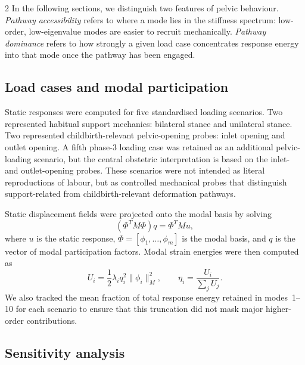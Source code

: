 \documentclass[openacc]{rsproca_new}
\begin{document}
\begin{multicols}{2}
In the following sections, we distinguish two features of pelvic behaviour. \emph{Pathway accessibility} refers to where a mode lies in the stiffness spectrum: low-order, low-eigenvalue modes are easier to recruit mechanically. \emph{Pathway dominance} refers to how strongly a given load case concentrates response energy into that mode once the pathway has been engaged.

\subsection{Load cases and modal participation}

Static responses were computed for five standardised loading scenarios. Two represented habitual support mechanics: bilateral stance and unilateral stance. Two represented childbirth-relevant pelvic-opening probes: inlet opening and outlet opening. A fifth phase-3 loading case was retained as an additional pelvic-loading scenario, but the central obstetric interpretation is based on the inlet- and outlet-opening probes. These scenarios were not intended as literal reproductions of labour, but as controlled mechanical probes that distinguish support-related from childbirth-relevant deformation pathways.

Static displacement fields were projected onto the modal basis by solving
\begin{equation}
(\Phi^{T}M\Phi)q = \Phi^{T}Mu,
\end{equation}
where $u$ is the static response, $\Phi=[\phi_{1},\ldots,\phi_{m}]$ is the modal basis, and $q$ is the vector of modal participation factors. Modal strain energies were then computed as
\begin{equation}
U_{i}=\frac{1}{2}\lambda_{i}q_{i}^{2}\lVert\phi_{i}\rVert_{M}^{2}, \qquad
\eta_{i}=\frac{U_{i}}{\sum_{j}U_{j}}.
\end{equation}
We also tracked the mean fraction of total response energy retained in modes~1--10 for each scenario to ensure that this truncation did not mask major higher-order contributions.


\subsection{Sensitivity analysis}


\end{multicols}
\end{document}
